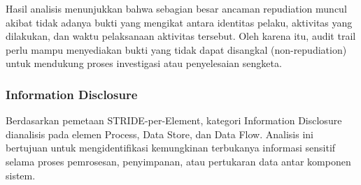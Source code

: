 Hasil analisis menunjukkan bahwa sebagian besar ancaman repudiation muncul akibat tidak adanya bukti yang mengikat antara identitas pelaku, aktivitas yang dilakukan, dan waktu pelaksanaan aktivitas tersebut. Oleh karena itu, audit trail perlu mampu menyediakan bukti yang tidak dapat disangkal (non-repudiation) untuk mendukung proses investigasi atau penyelesaian sengketa.

\subsubsection{Information Disclosure}

Berdasarkan pemetaan STRIDE-per-Element, kategori Information Disclosure dianalisis pada elemen Process, Data Store, dan Data Flow. Analisis ini bertujuan untuk mengidentifikasi kemungkinan terbukanya informasi sensitif selama proses pemrosesan, penyimpanan, atau pertukaran data antar komponen sistem.

